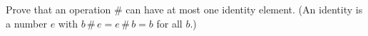 Prove that an operation $\#$ can have at most one identity element. (An identity is a number $e$ with $b\,\#\,e=e\,\#\,b=b$ for all $b$.)
